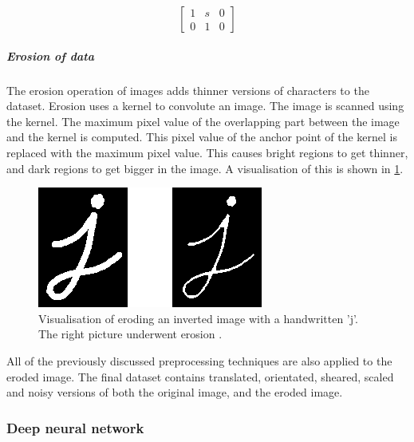 \documentclass{article}
\begin{document}
\begin{equation}
        \begin{bmatrix}
                1 & s & 0 \\
                0 & 1 & 0
        \end{bmatrix}
\end{equation}
\subparagraph{Erosion of data}
The erosion operation of images adds thinner versions of characters to the dataset. Erosion uses a kernel to convolute an image. 
The image is scanned using the kernel. The maximum pixel value of the overlapping part between the image and the kernel is computed. This pixel value of the anchor point of the kernel is replaced with the maximum pixel value. 
This causes bright regions to get thinner, and dark regions to get bigger in the image. A visualisation of this is shown in \ref{fig:erosion}. 
\begin{figure}
  \centering
  \includegraphics[width=\linewidth]{images/erosion}
  \caption{Visualisation of eroding an inverted image with a handwritten 'j'. The right picture underwent erosion \cite{erosion}.}
\label{fig:erosion}
\end{figure}
All of the previously discussed preprocessing techniques are also applied to the eroded image. The final dataset contains translated, orientated, sheared, scaled and noisy versions of both the original image, and the eroded image. 
\subsubsection{Deep neural network}
\label{sec:dnn}
\end{document}
